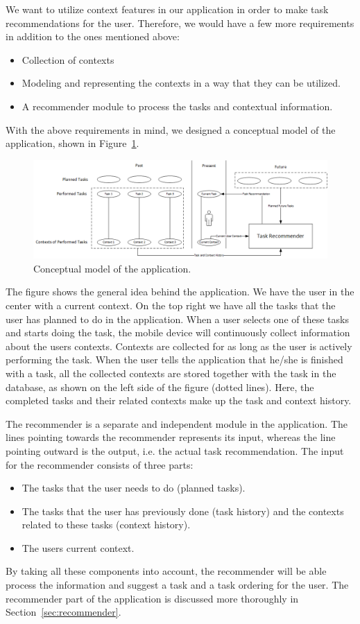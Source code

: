 We want to utilize context features in our application in order to make task recommendations for the user. Therefore, we would have a few more requirements in addition to the ones mentioned above:
\begin{itemize}
	\item Collection of contexts
	\item Modeling and representing the contexts in a way that they can be utilized.
	\item A recommender module to process the tasks and contextual information.
\end{itemize}

With the above requirements in mind, we designed a conceptual model of the application, shown in Figure~\ref{fig:conceptualmodel}.
\begin{figure}[tbp]
  \centering
  \includegraphics[width=\textwidth]{figures/ConceptualDiagram.png}
  \caption[Conceptual model]{Conceptual model of the application.}
  \label{fig:conceptualmodel}
\end{figure}
The figure shows the general idea behind the application. We have the user in the center with a current context. On the top right we have all the tasks that the user has planned to do in the application. When a user selects one of these tasks and starts doing the task, the mobile device will continuously collect information about the users contexts. Contexts are collected for as long as the user is actively performing the task. When the user tells the application that he/she is finished with a task, all the collected contexts are stored together with the task in the database, as shown on the left side of the figure (dotted lines). Here, the completed tasks and their related contexts make up the task and context history.

The recommender is a separate and independent module in the application. The lines pointing towards the recommender represents its input, whereas the line pointing outward is the output, i.e. the actual task recommendation. The input for the recommender consists of three parts:
\begin{itemize}
	\item The tasks that the user needs to do (planned tasks).
	\item The tasks that the user has previously done (task history) and the contexts related to these tasks (context history).
	\item The users current context.
\end{itemize}
By taking all these components into account, the recommender will be able process the information and suggest a task and a task ordering for the user. The recommender part of the application is discussed more thoroughly in Section~\ref{sec:recommender}.

